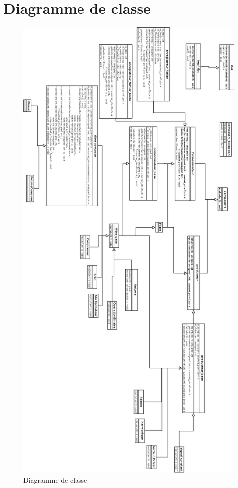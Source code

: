 \documentclass{article}
\begin{document}
\section{Diagramme de classe}
\begin{figure}
	\begin{center}
		\includegraphics[scale=0.25]{TP13}\\
		Diagramme de classe
	\end{center}
\end{figure}
\end{document}
